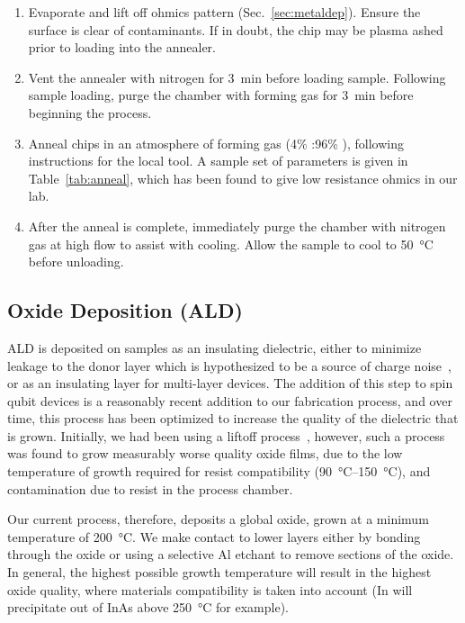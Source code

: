 \begin{enumerate}
    \item Evaporate and lift off ohmics pattern (Sec.~\ref{sec:metaldep}). Ensure the surface is clear of contaminants. If in doubt, the chip may be plasma ashed prior to loading into the annealer.
    \item Vent the annealer with nitrogen for \SI{3}{\minute} before loading sample. Following sample loading, purge the chamber with forming gas for \SI{3}{\minute} before beginning the process.
    \item Anneal chips in an atmosphere of forming gas (4\% :96\% ), following instructions for the local tool. A sample set of parameters is given in Table~\ref{tab:anneal}, which has been found to give low resistance ohmics in our lab.
    \item After the anneal is complete, immediately purge the chamber with nitrogen gas at high flow to assist with cooling. Allow the sample to cool to \SI{50}{\celsius} before unloading.
\end{enumerate}

\subsection{Oxide Deposition (ALD)}
\label{sec:ald}
ALD is deposited on samples as an insulating dielectric, either to minimize leakage to the donor layer which
is hypothesized to be a source of charge noise~\cite{PhysRevB.72.115331}, or as an insulating layer for
multi-layer devices. The addition of this step to spin qubit devices is a reasonably recent addition to our
fabrication process, and over time, this process has been optimized to increase the quality of the dielectric
that is grown. Initially, we had been using a liftoff process~\cite{doi:10.1063/1.1612904}, however, such a process
was found to grow measurably worse quality oxide films, due to the low temperature of growth required for resist
compatibility (\SIrange{90}{150}{\celsius}), and contamination due to resist in the process chamber.

Our current process, therefore, deposits a global oxide, grown at a minimum temperature of \SI{200}{\celsius}.
We make contact to lower layers either by bonding through the oxide or using a selective Al etchant to remove
sections of the oxide. In general, the highest possible growth temperature will result in the highest oxide
quality, where materials compatibility is taken into account (In will precipitate out of InAs above \SI{250}{\celsius} for example).

